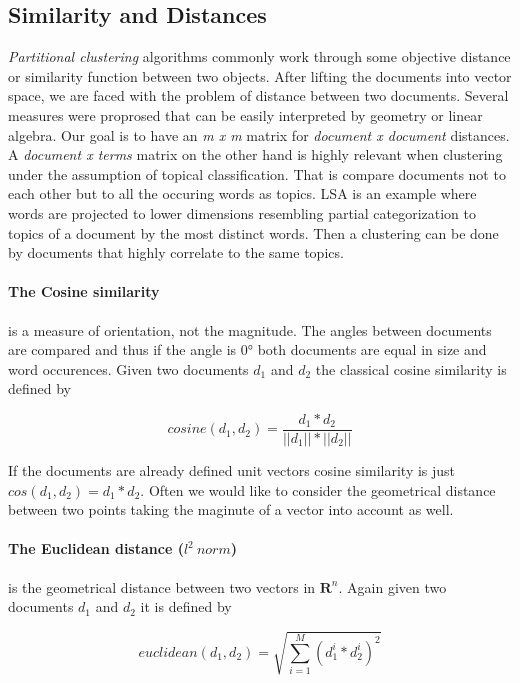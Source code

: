   \subsection{Similarity and Distances}
    \emph{Partitional clustering} algorithms commonly work through some objective distance or similarity function between two objects. After lifting the documents into vector space, we are faced with the problem of distance between two documents. Several measures were proprosed that can be easily interpreted by geometry or linear algebra. Our goal is to have an \emph{m x m} matrix for \emph{document x document} distances. A \emph{document x terms} matrix on the other hand is highly relevant when clustering under the assumption of topical classification. That is compare documents not to each other but to all the occuring words as topics. LSA is an example where words are projected to lower dimensions resembling partial categorization to topics of a document by the most distinct words. Then a clustering can be done by documents that highly correlate to the same topics.

    \paragraph{The Cosine similarity} is a measure of orientation, not the magnitude. The angles between documents are compared and thus if the angle is $0°$ both documents are equal in size and word occurences. Given two documents $d_1$ and $d_2$ the classical cosine similarity is defined by

    \begin{equation}
      cosine(d_1, d_2) = \frac{d_1 * d_2}{||d_1|| * ||d_2||}
    \end{equation}

    If the documents are already defined unit vectors cosine similarity is just $cos(d_1, d_2) = d_1 * d_2$. Often we would like to consider the geometrical distance between two points taking the maginute of a vector into account as well.

    \paragraph{The Euclidean distance ($l^2\:norm$)} is the geometrical distance between two vectors in $\mathbf{R}^n$. Again given two documents $d_1$ and $d_2$ it is defined by

    \begin{equation}
      euclidean(d_1, d_2) = \sqrt{\sum_{i=1}^{M}(d_1^i * d_2^i)^2}
    \end{equation}

